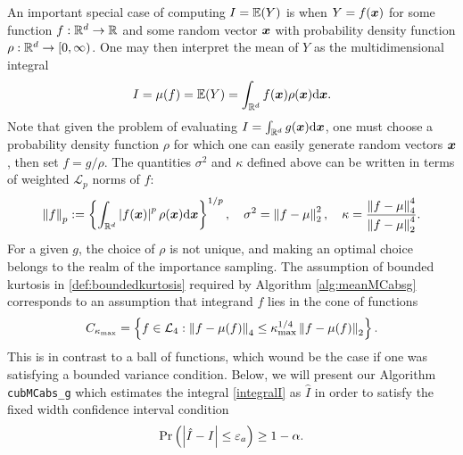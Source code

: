 \documentclass{iitthesis}
\theoremstyle{definition}
\begin{document}
An important special case of computing $I =\e(Y)$ is when $Y = f(\vx)$ for some function $f:\reals^d \to \reals$ and some random vector $\vx$ with probability density function $\rho: \reals^d \to [0,\infty)$. One may then interpret the mean of $Y$ as the multidimensional integral
\begin{align}\label{integralI}
I= \mu(f) = \e(Y) = \int_{\reals^d}f(\boldsymbol{x})\rho(\vx)\dif \vx.
\end{align}
Note that given the problem of evaluating $I = \int_{\reals^d}g(\vx)\dif\vx$, one must choose a probability density function $\rho$ for which one can easily generate random vectors $\vx$, then set $f = g/\rho$. The quantities $\sigma^2$ and $\kappa$ defined above can be written in terms of weighted $\mathcal{L}_p$ norms of $f$:
\begin{align*}
\norm[p]{f}:=\left\{ \int_{\reals^d}\abs{f(\vx)}^p\rho(\vx)\dif\vx\right\}^{1/p}, \quad \sigma^2 = \norm[2]{f-\mu}^2,\quad \kappa = \frac{\norm[4]{f-\mu}^4}{\norm[2]{f-\mu}^4}.
\end{align*}
For a given $g$, the choice of $\rho$ is not unique, and making an optimal choice belongs to the realm of the importance sampling. The assumption of bounded kurtosis in \eqref{def:boundedkurtosis} required by Algorithm \ref{alg:meanMCabsg} corresponds to an assumption that integrand $f$ lies in the cone of functions \cite{CDHHZ13}
\begin{align*}
C_{\kmax} = \left\{ f \in \mathcal{L}_4: \norm[4]{f-\mu(f)} \leq \kmax^{1/4} \norm[2]{f-\mu(f)}\right\}.
\end{align*}
This is in contrast to a ball of functions, which wound be the case if one was satisfying a bounded variance condition.
Below, we will present our Algorithm {\tt cubMCabs\_g} which estimates the integral \eqref{integralI}
as $\hat{I}$ in order to satisfy the fixed width confidence interval condition
\begin{align}\label{cubMCabsgCI}
\Pr \left(\abs{\hat{I}-I} \leq \varepsilon_a \right) \geq 1-\alpha.
\end{align}

\label{sec:cubMCabsg}
\end{document}
